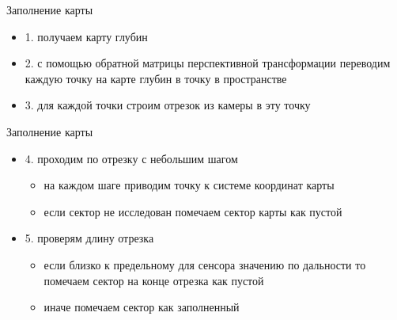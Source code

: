\begin{tslide}{Заполнение карты}

    \begin{itemize}
        \item 1. получаем карту глубин
        \item 2. с помощью обратной матрицы перспективной трансформации
            переводим каждую точку на карте глубин в точку в пространстве
        \item 3. для каждой точки строим отрезок из камеры в эту точку
    \end{itemize}
\end{tslide}
\begin{tslide}{Заполнение карты}
    \begin{itemize}
        \item 4. проходим по отрезку с небольшим шагом
            \begin{itemize}
            \item на каждом шаге приводим точку к системе координат карты
            \item если сектор не исследован помечаем сектор карты как пустой
            \end{itemize}
        \item 5. проверям длину отрезка
            \begin{itemize}
            \item если близко к предельному для сенсора значению по дальности
                то помечаем сектор на конце отрезка как пустой
            \item иначе помечаем сектор как заполненный
            \end{itemize}
    \end{itemize}

\end{tslide}


